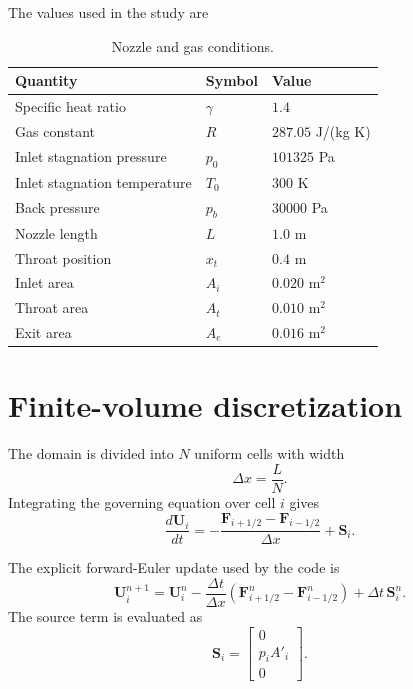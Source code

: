 \documentclass[11pt,a4paper]{article}
\begin{document}
The values used in the study are
\begin{table}[h]
\centering
\caption{Nozzle and gas conditions.}
\begin{tabular}{lll}
\toprule
Quantity & Symbol & Value \\
\midrule
Specific heat ratio & $\gamma$ & $1.4$ \\
Gas constant & $R$ & $287.05$ J/(kg K) \\
Inlet stagnation pressure & $p_0$ & $101325$ Pa \\
Inlet stagnation temperature & $T_0$ & $300$ K \\
Back pressure & $p_b$ & $30000$ Pa \\
Nozzle length & $L$ & $1.0$ m \\
Throat position & $x_t$ & $0.4$ m \\
Inlet area & $A_i$ & $0.020$ m$^2$ \\
Throat area & $A_t$ & $0.010$ m$^2$ \\
Exit area & $A_e$ & $0.016$ m$^2$ \\
\bottomrule
\end{tabular}
\end{table}

\section{Finite-volume discretization}
The domain is divided into $N$ uniform cells with width
\begin{equation}
  \Delta x = \frac{L}{N}.
\end{equation}
Integrating the governing equation over cell $i$ gives
\begin{equation}
  \frac{d\mathbf U_i}{dt}
  = -\frac{\mathbf F_{i+1/2}-\mathbf F_{i-1/2}}{\Delta x}
    + \mathbf S_i.
\end{equation}

The explicit forward-Euler update used by the code is
\begin{equation}
  \mathbf U_i^{n+1}=\mathbf U_i^n
  -\frac{\Delta t}{\Delta x}
   \left(\mathbf F_{i+1/2}^n-\mathbf F_{i-1/2}^n\right)
  +\Delta t\,\mathbf S_i^n.
\end{equation}
The source term is evaluated as
\begin{equation}
  \mathbf S_i =
  \begin{bmatrix}
    0\\p_i A'_i\\0
  \end{bmatrix}.
\end{equation}
\end{document}
